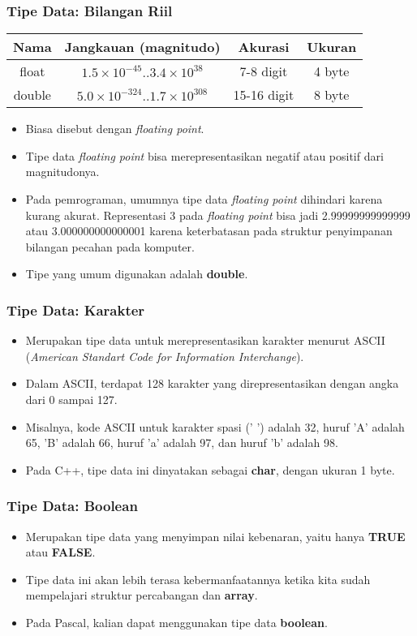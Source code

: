 \begin{frame}
\frametitle{Tipe Data: Bilangan Riil}
\begin{table}[ht]
  \begin{tabular}{|c|c|c|c|}
    \hline Nama  & Jangkauan (magnitudo) & Akurasi & Ukuran \\
    \hline float & $1.5\times10^{-45} .. 3.4\times10^{38}$ & 7-8 digit & 4 byte\\
    \hline double & $5.0\times10^{-324} .. 1.7\times10^{308}$ & 15-16 digit & 8 byte \\
    \hline
  \end{tabular}
\end{table}
\begin{itemize}
  \item Biasa disebut dengan \textit{floating point}.
  \item Tipe data \textit{floating point} bisa merepresentasikan negatif atau positif dari magnitudonya.
  \item Pada pemrograman, umumnya tipe data \textit{floating point} dihindari karena kurang akurat. Representasi 3 pada \textit{floating point} bisa jadi 2.99999999999999 atau 3.000000000000001 karena keterbatasan pada struktur penyimpanan bilangan pecahan pada komputer.
  \item Tipe yang umum digunakan adalah \alert{\textbf{double}}.
\end{itemize}
\end{frame}

\begin{frame}
\frametitle{Tipe Data: Karakter}
\begin{itemize}
  \item Merupakan tipe data untuk merepresentasikan karakter menurut ASCII (\textit{American Standart Code for Information Interchange}).
  \item Dalam ASCII, terdapat 128 karakter yang direpresentasikan dengan angka dari 0 sampai 127.
  \item Misalnya, kode ASCII untuk karakter spasi (' ') adalah 32, huruf 'A' adalah 65, 'B' adalah 66, huruf 'a' adalah 97, dan huruf 'b' adalah 98.
  \item Pada C++, tipe data ini dinyatakan sebagai \alert{\textbf{char}}, dengan ukuran 1 byte.
\end{itemize}
\end{frame}

\begin{frame}
\frametitle{Tipe Data: Boolean}
\begin{itemize}
  \item Merupakan tipe data yang menyimpan nilai kebenaran, yaitu hanya \textbf{TRUE} atau \textbf{FALSE}.
  \item Tipe data ini akan lebih terasa kebermanfaatannya ketika kita sudah mempelajari struktur percabangan dan \textbf{array}.
  \item Pada Pascal, kalian dapat menggunakan tipe data \alert{\textbf{boolean}}.
\end{itemize}
\end{frame}


